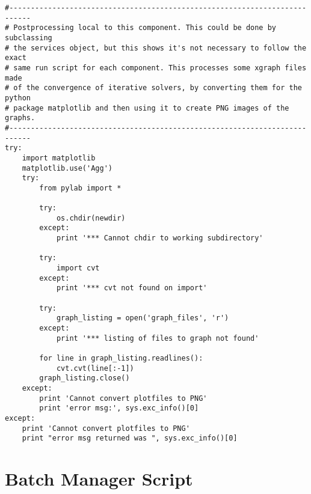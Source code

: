 \begin{lstlisting}[frame=single,
    caption={Splib extra code for creating graph files},
                       label=splibextra]
#---------------------------------------------------------------------------
# Postprocessing local to this component. This could be done by subclassing
# the services object, but this shows it's not necessary to follow the exact
# same run script for each component. This processes some xgraph files made
# of the convergence of iterative solvers, by converting them for the python
# package matplotlib and then using it to create PNG images of the graphs.
#---------------------------------------------------------------------------
try:
    import matplotlib
    matplotlib.use('Agg')
    try:
        from pylab import *
    
        try:
            os.chdir(newdir)
        except:
            print '*** Cannot chdir to working subdirectory'
    
        try:
            import cvt
        except:
            print '*** cvt not found on import'
    
        try:
            graph_listing = open('graph_files', 'r')
        except: 
            print '*** listing of files to graph not found'
    
        for line in graph_listing.readlines():
            cvt.cvt(line[:-1])
        graph_listing.close()
    except:
        print 'Cannot convert plotfiles to PNG'
        print 'error msg:', sys.exc_info()[0]
except:
    print 'Cannot convert plotfiles to PNG'
    print "error msg returned was ", sys.exc_info()[0]
\end{lstlisting}

\section{Batch Manager Script}

